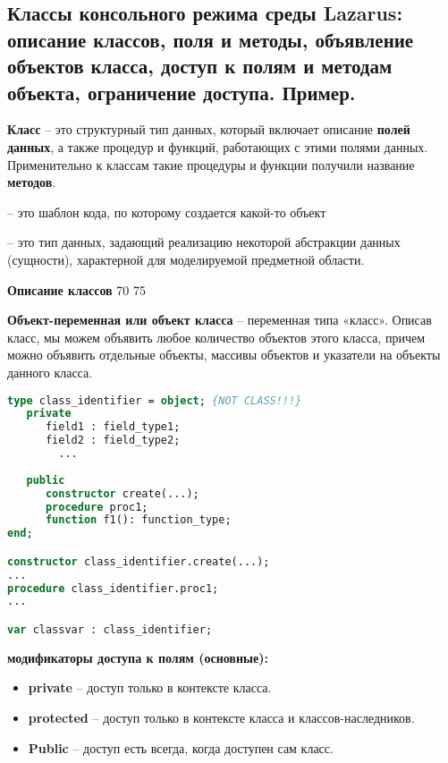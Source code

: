



\newpage\subsection{Классы консольного режима среды Lazarus: описание классов, поля и методы, объявление 
объектов класса, доступ к полям и методам объекта, ограничение доступа. Пример. }

\begin{myquote}
            
\end{myquote}

{\bf Класс} – это структурный тип данных, который включает описание {\bf {полей данных}}, а также процедур и функций, работающих с этими полями данных. Применительно к классам такие процедуры и функции получили название {\bf методов}.

	 – это шаблон кода, по которому создается какой-то объект

     – это тип данных, задающий реализацию некоторой абстракции данных (сущности), характерной для моделируемой предметной области. 


{\bf {Описание классов}}
 {70}
 {75}

{\bf Объект-переменная или объект класса} – переменная типа «класс». Описав класс, мы можем объявить любое количество объектов этого 
класса, причем можно объявить отдельные объекты, массивы объектов и указатели на объекты данного класса.

\begin{lstlisting}[language=Pascal]
type class_identifier = object; {NOT CLASS!!!}
   private
      field1 : field_type1;  
      field2 : field_type2;  
        ...
   
   public
      constructor create(...);
      procedure proc1;  
      function f1(): function_type;
end;  

constructor class_identifier.create(...);
...
procedure class_identifier.proc1;  
...

var classvar : class_identifier;
\end{lstlisting}

\vspace*{10pt}

{\bf модификаторы доступа к полям (основные):}
\begin{itemize}
\item {\bf private} – доступ только в контексте класса.

\item {\bf protected} – доступ только в контексте класса и классов-наследников.

\item {\bf Public} – доступ есть всегда, когда доступен сам класс.
\end{itemize}


